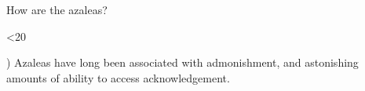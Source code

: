 \documentclass[stdpressrelease,11pt]{newlfm}
\begin{document}
\begin{newlfm}
\noindent How are the azaleas?

\setcounter{sentcnt}{0}
\loop \ifnum\thesentcnt<20%
  \addtocounter{sentcnt}{1}%
\thesentcnt) Azaleas have long been associated with admonishment, and astonishing amounts
of ability to access acknowledgement.
    \repeat%

\end{newlfm}
\end{document}
